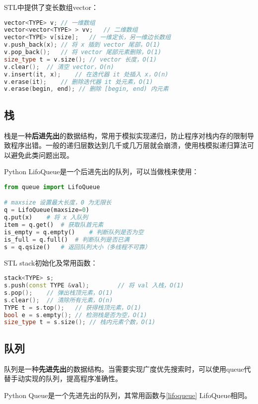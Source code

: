 STL中提供了变长数组vector：

\begin{lstlisting}[language=c++]
vector<TYPE> v;	// 一维数组
vector<vector<TYPE> > vv;	// 二维数组
vector<TYPE> v[size];	// 一维定长，另一维边长数组
v.push_back(x);	// 将 x 插到 vector 尾部，O(1)
v.pop_back();	// 将 vector 尾部元素删除，O(1)
size_type t = v.size();	// vector 长度，O(1)
v.clear();	// 清空 vector，O(n)
v.insert(it, x);	// 在迭代器 it 处插入 x，O(n)
v.erase(it);	// 删除迭代器 it 处元素，O(1)
v.erase(begin, end); // 删除 [begin, end) 内元素
\end{lstlisting}

\subsection{栈}

栈是一种\textbf{后进先出}的数据结构，常用于模拟实现递归，防止程序对栈内存的限制导致程序出错。一般的递归层数达到几千或几万层就会崩溃，使用栈模拟递归算法可以避免此类问题出现。

Python LifoQueue是一个后进先出的队列，可以当做栈来使用：\label{lifoqueue}

\begin{lstlisting}[language=python]
from queue import LifoQueue

# maxsize 设置最大长度，0 为无限长
q = LifoQueue(maxsize=0)
q.put(x)	# 将 x 入队列
item = q.get()	# 获取队首元素
is_empty = q.empty()	# 判断队列是否为空
is_full = q.full()	# 判断队列是否已满
s = q.qsize()	# 返回队列大小（多线程不可靠）
\end{lstlisting}

STL stack初始化及常用函数：

\begin{lstlisting}[language=c++]
stack<TYPE> s;
s.push(const TYPE &val);		// 将 val 入栈，O(1)
s.pop();	// 弹出栈顶元素，O(1)
s.clear();	// 清除所有元素，O(n)
TYPE t = s.top();	// 获得栈顶元素，O(1)
bool e = s.empty();	// 检测栈是否为空，O(1)
size_type t = s.size();	// 栈内元素个数，O(1)
\end{lstlisting}

\subsection{队列}

队列是一种\textbf{先进先出}的数据结构。当需要实现广度优先搜索时，可以使用queue代替手动实现的队列，提高程序准确性。

Python  Queue是一个先进先出的队列，其常用函数与\ref{lifoqueue} LifoQueue相同。

